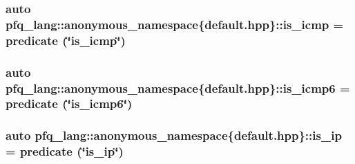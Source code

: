 \hypertarget{namespacepfq__lang_1_1anonymous__namespace_02default_8hpp_03_aecfdadd54cbd2d4e93a7f246b6bcd0fc}{
\subsubsection[{is\+\_\+icmp}]{\setlength{\rightskip}{0pt plus 5cm}auto pfq\+\_\+lang\+::anonymous\+\_\+namespace\{default.\+hpp\}\+::is\+\_\+icmp = {\bf predicate} (\char`\"{}is\+\_\+icmp\char`\"{})}}\label{namespacepfq__lang_1_1anonymous__namespace_02default_8hpp_03_aecfdadd54cbd2d4e93a7f246b6bcd0fc}
\hypertarget{namespacepfq__lang_1_1anonymous__namespace_02default_8hpp_03_abbce0d21ac217034eac2cd1366f78695}{
\subsubsection[{is\+\_\+icmp6}]{\setlength{\rightskip}{0pt plus 5cm}auto pfq\+\_\+lang\+::anonymous\+\_\+namespace\{default.\+hpp\}\+::is\+\_\+icmp6 = {\bf predicate} (\char`\"{}is\+\_\+icmp6\char`\"{})}}\label{namespacepfq__lang_1_1anonymous__namespace_02default_8hpp_03_abbce0d21ac217034eac2cd1366f78695}
\hypertarget{namespacepfq__lang_1_1anonymous__namespace_02default_8hpp_03_a43ee18537268245a58354e044a134df5}{
\subsubsection[{is\+\_\+ip}]{\setlength{\rightskip}{0pt plus 5cm}auto pfq\+\_\+lang\+::anonymous\+\_\+namespace\{default.\+hpp\}\+::is\+\_\+ip = {\bf predicate} (\char`\"{}is\+\_\+ip\char`\"{})}}\label{namespacepfq__lang_1_1anonymous__namespace_02default_8hpp_03_a43ee18537268245a58354e044a134df5}
